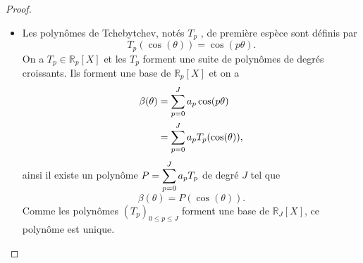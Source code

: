 \begin{proof}
\begin{itemize}
\item Les polynômes de Tchebytchev, notés $T_p$ , de première espèce sont définis par
\begin{equation}
T_p(\cos (\theta)) = \cos (p \theta).
\end{equation}
On a $T_p \in \mathbb{R}_p[X]$ et les $T_p$ forment une suite de polynômes de degrés croissants. Ils forment une base de $\mathbb{R}_p[X]$ et on a
\begin{align*}
\beta(\theta) & = \displaystyle\sum\limits_{p=0}^J a_p \cos (p \theta) \\
	& = \displaystyle\sum\limits_{p=0}^J a_p T_p( \cos (\theta)),
\end{align*}
ainsi il existe un polynôme $P = \displaystyle\sum\limits_{p=0}^J a_p T_p$ de degré $J$ tel que
\begin{equation}
\beta(\theta) = P(\cos (\theta)).
\end{equation}
Comme les polynômes $(T_p)_{0 \leq p \leq J}$ forment une base de $\mathbb{R}_{J}[X]$, ce polynôme est unique.


\end{itemize}
\end{proof}
